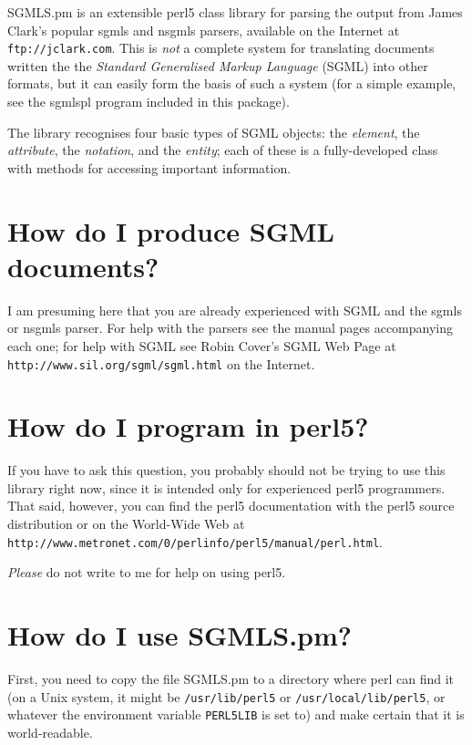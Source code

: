 {\sc SGMLS.pm} is an extensible {\sc perl5}
class library for parsing the output from James Clark's popular
{\sc sgmls} and {\sc nsgmls} parsers, available on the Internet at {\tt ftp://jclark.com}.
This is {\em not\/} a complete system for translating
documents written the the {\em Standard Generalised Markup
Language\/} ({\sc SGML}) into other formats, but it can easily
form the basis of such a system (for a simple example, see the {\sc sgmlspl}
program included in this package).

The library recognises four basic types of {\sc SGML} objects: the
{\em element\/}, the
{\em attribute\/},
the {\em notation\/}, and the
{\em entity\/}; each
of these is a fully-developed class with methods for accessing
important information.




\section{How do I produce {\sc SGML} documents?}
\label{SGML}


I am presuming here that you are already experienced with {\sc SGML}
and the {\sc sgmls} or {\sc nsgmls} parser.  For help with the parsers see the
manual pages accompanying each one; for help with {\sc SGML} see Robin
Cover's SGML Web Page at {\tt http://www.sil.org/sgml/sgml.html}
on the Internet.




\section{How do I program in {\sc perl5}?}
\label{PERL5}


If you have to ask this question, you probably should not be
trying to use this library right now, since it is intended only for
experienced {\sc perl5} programmers.  That said, however, you can find the
{\sc perl5} documentation with the {\sc perl5} source distribution or on the
World-Wide Web at {\tt http://www.metronet.com/0/perlinfo/perl5/manual/perl.html}.

{\em Please\/} do not write to me for help on using
{\sc perl5}.




\section{How do I use {\sc SGMLS.pm}?}
\label{SGMLS}


First, you need to copy the file {\sc SGMLS.pm} to a directory where
perl can find it (on a Unix system, it might be
{\tt /usr/lib/perl5} or
{\tt /usr/local/lib/perl5}, or whatever the environment
variable {\tt PERL5LIB} is set to) and make certain that it
is world-readable.

